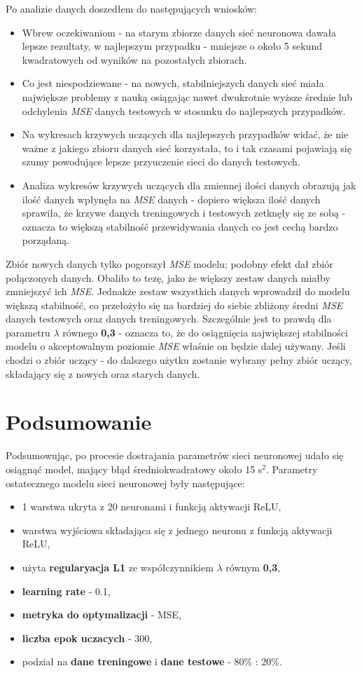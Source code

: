 \documentclass[12pt]{aghdpl}
\begin{document}
		Po analizie danych doszedłem do następujących wniosków:
		\begin{itemize}
		\item Wbrew oczekiwaniom - na starym zbiorze danych sieć neuronowa dawała lepsze rezultaty, w najlepszym przypadku - mniejsze o około 5 sekund kwadratowych od wyników na pozostałych zbiorach.
		\item Co jest niespodziewane - na nowych, stabilniejszych danych sieć miała największe problemy z nauką osiągając nawet dwukrotnie wyższe średnie lub odchylenia \textit{MSE} danych testowych w stosunku do najlepszych przypadków.
		\item Na wykresach krzywych uczących dla najlepszych przypadków widać, że nie ważne z jakiego zbioru danych sieć korzystała, to i tak czasami pojawiają się szumy powodujące lepsze przyuczenie sieci do danych testowych.
		\item Analiza wykresów krzywych uczących dla zmiennej ilości danych obrazują jak ilość danych wpłynęła na \textit{MSE} danych - dopiero większa ilość danych sprawiła, że krzywe danych treningowych i testowych zetknęły się ze sobą - oznacza to większą stabilność przewidywania danych co jest cechą bardzo porządaną.
		\end{itemize}	
		
		Zbiór nowych danych tylko pogorszył \textit{MSE} modelu; podobny efekt dał zbiór połączonych danych. Obaliło to tezę, jako że większy zestaw danych miałby zmniejszyć ich \textit{MSE}. Jednakże zestaw wszystkich danych wprowadził do modelu większą stabilność, co przełożyło się na bardziej do siebie zbliżony średni \textit{MSE} danych testowych oraz danych treningowych. Szczególnie jest to prawdą dla parametru $\lambda$ równego \textbf{0,3} - oznacza to, że do osiągnięcia największej stabilności modelu o akceptowalnym poziomie \textit{MSE} właśnie on będzie dalej używany. Jeśli chodzi o zbiór uczący - do dalszego użytku zostanie wybrany pełny zbiór uczący, składający się z nowych oraz starych danych.
		
		\section{Podsumowanie}	
		Podsumowując, po procesie dostrajania parametrów sieci neuronowej udało się osiągnąć model, mający błąd średniokwadratowy około 15 s$^2$. Parametry ostatecznego modelu sieci neuronowej były następujące:
		\begin{itemize}
		\item 1 warstwa ukryta z 20 neuronami i funkcją aktywacji ReLU,
		\item warstwa wyjściowa składająca się z jednego neuronu z funkcją aktywacji ReLU,
		\item użyta \textbf{regularyacja L1} ze współczynnikiem $\lambda$ równym \textbf{0,3},
		\item \textbf{learning rate} - 0.1,
		\item \textbf{metryka do optymalizacji} - MSE,
		\item \textbf{liczba epok uczacych} - 300,
		\item podział na \textbf{dane treningowe} i \textbf{dane testowe} - 80\% : 20\%.
		\end{itemize}
		
\end{document}
